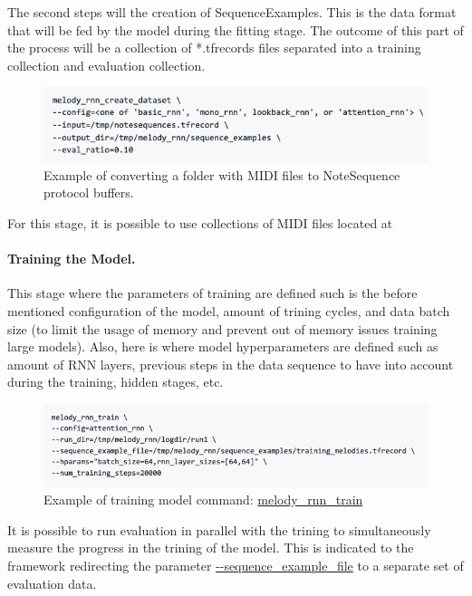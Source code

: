 
The second steps will the creation of SequenceExamples. This is the data format that will
be fed by the model during the fitting stage. The outcome of this part of the process will
be a collection of *.tfrecords files separated into a training collection and evaluation
collection.

\begin{figure}[h!]
  \centering
  \caption{Example of converting a folder with MIDI files to NoteSequence protocol buffers.}
  \includegraphics[width=\linewidth]{image/fig_JDF04.png}
\end{figure}


For this stage, it is possible to use collections of MIDI files located at

\paragraph{Training the Model.} This stage where the parameters of training are defined
such is the before mentioned configuration of the model, amount of trining cycles, and
data batch size (to limit the usage of memory and prevent out of memory issues training
large models). Also, here is where model hyperparameters are defined such as amount of RNN
layers, previous steps in the data sequence to have into account during the training,
hidden stages, etc.

\begin{figure}[h!]
  \caption{Example of training model command: \url{melody_rnn_train}}
  \includegraphics[width=\linewidth]{image/fig_JDF05.png}
\end{figure}

It is possible to run evaluation in parallel with the trining to simultaneously measure
the progress in the trining of the model. This is indicated to the framework redirecting
the parameter \url{--sequence_example_file} to a separate set of evaluation data.

